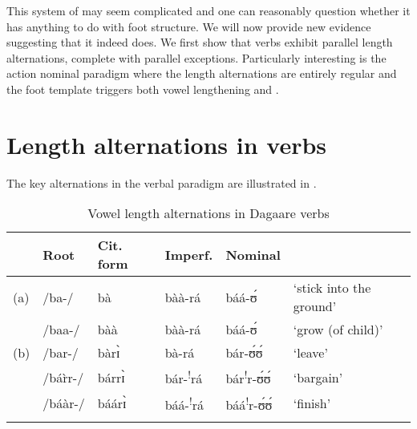 \documentclass[output=paper
,newtxmath
,modfonts
,nonflat]{langsci/langscibook}
\begin{document}
{This system of  may seem complicated and one can reasonably question whether it has anything to do with foot structure. We will now provide new evidence suggesting that it indeed does. We first show that verbs exhibit parallel length alternations, complete with parallel exceptions. Particularly interesting is the action nominal paradigm where the length alternations are entirely regular and the foot template triggers both vowel lengthening and .}


\section{Length alternations in verbs}


{The key alternations in the verbal paradigm are illustrated in .}{} 

\begin{table}
\begin{tabularx}{\textwidth}{lllllX}
\lsptoprule
& {Root} & {Cit. form} & {Imperf.} & {Nominal} & \\
\midrule
(a) & /ba-/ & bà & bàà-rá & báá-ʊ́ & ‘stick into the ground’\\
& /baa-/ & bàà & bàà-rá & báá-ʊ́ & ‘grow (of child)’\\
(b) & /bar-/ & bàrɪ̀ & bà-rá & bár-ʊ́ʊ́ & ‘leave’\\
& /bá\`{r}r-/ & bárrɪ̀ & bár-\textsuperscript{!}rá & bár\textsuperscript{!}r-ʊ́ʊ́ & ‘bargain’\\
& /báàr-/ & báárɪ̀ & báá-\textsuperscript{!}rá & báá\textsuperscript{!}r-ʊ́ʊ́ & ‘finish’\\
\lspbottomrule
\end{tabularx}
\caption{Vowel length alternations in Dagaare verbs}
\label{tab:anttila:5}
\end{table}
\end{document}
